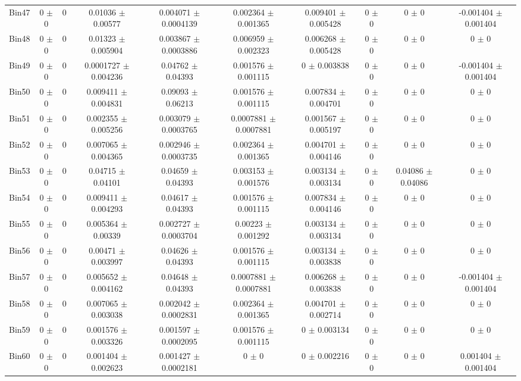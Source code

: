 \begin{tabular}{@{\extracolsep{4pt}}lccccccccc@{}}
     Bin47 & 0 $\pm$ 0 & 0 & 0.01036 $\pm$ 0.00577 & 0.004071 $\pm$ 0.0004139 & 0.002364 $\pm$ 0.001365 & 0.009401 $\pm$ 0.005428 & 0 $\pm$ 0 & 0 $\pm$ 0 & -0.001404 $\pm$ 0.001404 \\ 
     Bin48 & 0 $\pm$ 0 & 0 & 0.01323 $\pm$ 0.005904 & 0.003867 $\pm$ 0.0003886 & 0.006959 $\pm$ 0.002323 & 0.006268 $\pm$ 0.005428 & 0 $\pm$ 0 & 0 $\pm$ 0 & 0 $\pm$ 0 \\ 
     Bin49 & 0 $\pm$ 0 & 0 & 0.0001727 $\pm$ 0.004236 & 0.04762 $\pm$ 0.04393 & 0.001576 $\pm$ 0.001115 & 0 $\pm$ 0.003838 & 0 $\pm$ 0 & 0 $\pm$ 0 & -0.001404 $\pm$ 0.001404 \\ 
     Bin50 & 0 $\pm$ 0 & 0 & 0.009411 $\pm$ 0.004831 & 0.09093 $\pm$ 0.06213 & 0.001576 $\pm$ 0.001115 & 0.007834 $\pm$ 0.004701 & 0 $\pm$ 0 & 0 $\pm$ 0 & 0 $\pm$ 0 \\ 
     Bin51 & 0 $\pm$ 0 & 0 & 0.002355 $\pm$ 0.005256 & 0.003079 $\pm$ 0.0003765 & 0.0007881 $\pm$ 0.0007881 & 0.001567 $\pm$ 0.005197 & 0 $\pm$ 0 & 0 $\pm$ 0 & 0 $\pm$ 0 \\ 
     Bin52 & 0 $\pm$ 0 & 0 & 0.007065 $\pm$ 0.004365 & 0.002946 $\pm$ 0.0003735 & 0.002364 $\pm$ 0.001365 & 0.004701 $\pm$ 0.004146 & 0 $\pm$ 0 & 0 $\pm$ 0 & 0 $\pm$ 0 \\ 
     Bin53 & 0 $\pm$ 0 & 0 & 0.04715 $\pm$ 0.04101 & 0.04659 $\pm$ 0.04393 & 0.003153 $\pm$ 0.001576 & 0.003134 $\pm$ 0.003134 & 0 $\pm$ 0 & 0.04086 $\pm$ 0.04086 & 0 $\pm$ 0 \\ 
     Bin54 & 0 $\pm$ 0 & 0 & 0.009411 $\pm$ 0.004293 & 0.04617 $\pm$ 0.04393 & 0.001576 $\pm$ 0.001115 & 0.007834 $\pm$ 0.004146 & 0 $\pm$ 0 & 0 $\pm$ 0 & 0 $\pm$ 0 \\ 
     Bin55 & 0 $\pm$ 0 & 0 & 0.005364 $\pm$ 0.00339 & 0.002727 $\pm$ 0.0003704 & 0.00223 $\pm$ 0.001292 & 0.003134 $\pm$ 0.003134 & 0 $\pm$ 0 & 0 $\pm$ 0 & 0 $\pm$ 0 \\ 
     Bin56 & 0 $\pm$ 0 & 0 & 0.00471 $\pm$ 0.003997 & 0.04626 $\pm$ 0.04393 & 0.001576 $\pm$ 0.001115 & 0.003134 $\pm$ 0.003838 & 0 $\pm$ 0 & 0 $\pm$ 0 & 0 $\pm$ 0 \\ 
     Bin57 & 0 $\pm$ 0 & 0 & 0.005652 $\pm$ 0.004162 & 0.04648 $\pm$ 0.04393 & 0.0007881 $\pm$ 0.0007881 & 0.006268 $\pm$ 0.003838 & 0 $\pm$ 0 & 0 $\pm$ 0 & -0.001404 $\pm$ 0.001404 \\ 
     Bin58 & 0 $\pm$ 0 & 0 & 0.007065 $\pm$ 0.003038 & 0.002042 $\pm$ 0.0002831 & 0.002364 $\pm$ 0.001365 & 0.004701 $\pm$ 0.002714 & 0 $\pm$ 0 & 0 $\pm$ 0 & 0 $\pm$ 0 \\ 
     Bin59 & 0 $\pm$ 0 & 0 & 0.001576 $\pm$ 0.003326 & 0.001597 $\pm$ 0.0002095 & 0.001576 $\pm$ 0.001115 & 0 $\pm$ 0.003134 & 0 $\pm$ 0 & 0 $\pm$ 0 & 0 $\pm$ 0 \\ 
     Bin60 & 0 $\pm$ 0 & 0 & 0.001404 $\pm$ 0.002623 & 0.001427 $\pm$ 0.0002181 & 0 $\pm$ 0 & 0 $\pm$ 0.002216 & 0 $\pm$ 0 & 0 $\pm$ 0 & 0.001404 $\pm$ 0.001404 \\ 
\hline\hline
  \end{tabular}
